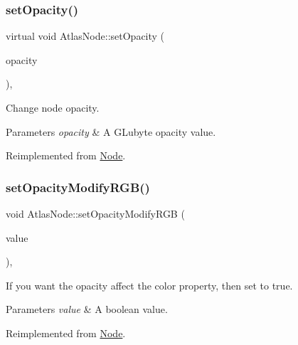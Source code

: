 \subsubsection{\texorpdfstring{set\+Opacity()}{setOpacity()}\hspace{0.1cm}{\footnotesize\ttfamily [2/2]}}
{\footnotesize\ttfamily virtual void Atlas\+Node\+::set\+Opacity (\begin{DoxyParamCaption}\item[{G\+Lubyte}]{opacity }\end{DoxyParamCaption})\hspace{0.3cm}{\ttfamily [override]}, {\ttfamily [virtual]}}

Change node opacity. 
\begin{DoxyParams}{Parameters}
{\em opacity} & A G\+Lubyte opacity value. \\
\hline
\end{DoxyParams}


Reimplemented from \hyperlink{classNode_ae41a9db63bfa3d466ee7c9d79c35352d}{Node}.

\mbox{\label{classAtlasNode_adb5151b64bb92b157133f9efb07124a8}} 
\subsubsection{\texorpdfstring{set\+Opacity\+Modify\+R\+G\+B()}{setOpacityModifyRGB()}\hspace{0.1cm}{\footnotesize\ttfamily [1/2]}}
{\footnotesize\ttfamily void Atlas\+Node\+::set\+Opacity\+Modify\+R\+GB (\begin{DoxyParamCaption}\item[{bool}]{value }\end{DoxyParamCaption})\hspace{0.3cm}{\ttfamily [override]}, {\ttfamily [virtual]}}

If you want the opacity affect the color property, then set to true. 
\begin{DoxyParams}{Parameters}
{\em value} & A boolean value. \\
\hline
\end{DoxyParams}


Reimplemented from \hyperlink{classNode_a978c5435ab23f76e9efdf0f7e9e288e5}{Node}.

